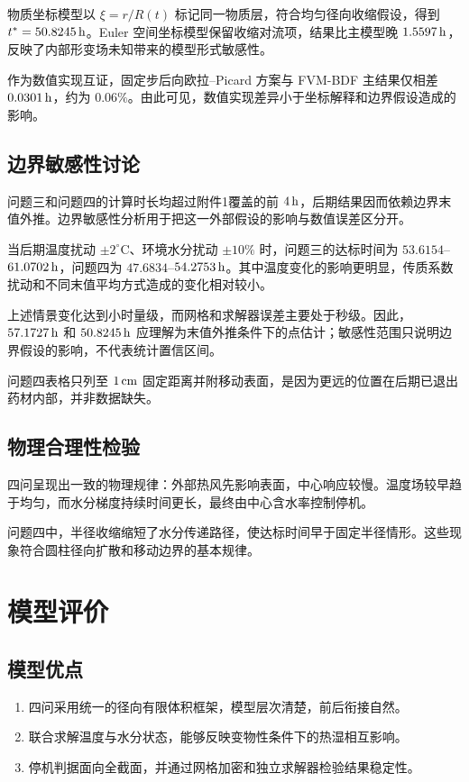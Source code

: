 \documentclass[UTF8,a4paper,12pt]{ctexart}
\begin{document}
物质坐标模型以 $\xi=r/R(t)$ 标记同一物质层，符合均匀径向收缩假设，得到 $t^*=50.8245\rm\,h$。Euler 空间坐标模型保留收缩对流项，结果比主模型晚 $1.5597\rm\,h$，反映了内部形变场未知带来的模型形式敏感性。

作为数值实现互证，固定步后向欧拉--Picard 方案与 FVM-BDF 主结果仅相差 $0.0301\rm\,h$，约为 $0.06\%$。由此可见，数值实现差异小于坐标解释和边界假设造成的影响。

\subsection{边界敏感性讨论}
问题三和问题四的计算时长均超过附件1覆盖的前 $4\rm\,h$，后期结果因而依赖边界末值外推。边界敏感性分析用于把这一外部假设的影响与数值误差区分开。

当后期温度扰动 $\pm2^\circ\mathrm C$、环境水分扰动 $\pm10\%$ 时，问题三的达标时间为 $53.6154$--$61.0702\rm\,h$，问题四为 $47.6834$--$54.2753\rm\,h$。其中温度变化的影响更明显，传质系数扰动和不同末值平均方式造成的变化相对较小。

上述情景变化达到小时量级，而网格和求解器误差主要处于秒级。因此，$57.1727\rm\,h$ 和 $50.8245\rm\,h$ 应理解为末值外推条件下的点估计；敏感性范围只说明边界假设的影响，不代表统计置信区间。

问题四表格只列至 $1\rm\,cm$ 固定距离并附移动表面，是因为更远的位置在后期已退出药材内部，并非数据缺失。

\subsection{物理合理性检验}
四问呈现出一致的物理规律：外部热风先影响表面，中心响应较慢。温度场较早趋于均匀，而水分梯度持续时间更长，最终由中心含水率控制停机。

问题四中，半径收缩缩短了水分传递路径，使达标时间早于固定半径情形。这些现象符合圆柱径向扩散和移动边界的基本规律。

\section{模型评价}
\subsection{模型优点}
\begin{enumerate}[label=\arabic*、,leftmargin=2.5em,itemsep=0.4em]
  \item 四问采用统一的径向有限体积框架，模型层次清楚，前后衔接自然。
  \item 联合求解温度与水分状态，能够反映变物性条件下的热湿相互影响。
  \item 停机判据面向全截面，并通过网格加密和独立求解器检验结果稳定性。
\end{enumerate}
\end{document}
